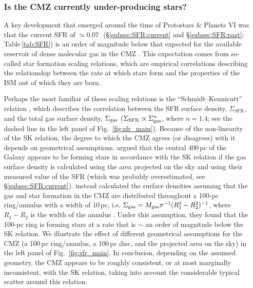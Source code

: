 \subsubsection{Is the CMZ currently under-producing stars?} 
\label{subsec:SFR:context}




A key development that emerged around the time of Protostars \& Planets VI was that the current SFR of \linebreak $\simeq0.07$\,\msunyr \ (\S\ref{subsec:SFR:current} and \S\ref{subsec:SFR:past}; Table\,\ref{tab:SFR}) is an order of magnitude below that expected for the available reservoir of dense molecular gas in the CMZ \citep{Longmore2013b}.
This expectation comes from so-called star formation scaling relations, which are empirical correlations describing the relationship between the rate at which stars form and the properties of the ISM out of which they are born.

Perhaps the most familiar of these scaling relations is the ``Schmidt–Kennicutt'' relation \citep[][hereafter SK relation]{Schmidt1959,Kennicutt1998}, which describes the correlation between the SFR surface density, $\Sigma_\mathrm{SFR}$, and the total gas surface density, $\Sigma_{\rm gas}$ ($\Sigma_\mathrm{SFR}\propto\Sigma_{\rm gas}^{n}$, where $n=1.4$; see the dashed line in the left panel of Fig.~\ref{fig:sfr_main}). Because of the non-linearity of the SK relation, the degree to which the CMZ agrees (or disagrees) with it depends on geometrical assumptions. \citet{Yusef-Zadeh2009} argued that the central 400\,pc of the Galaxy appears to be forming stars in accordance with the SK relation if the gas surface density is calculated using the area projected on the sky and using their measured value of the SFR (which was probably overestimated, see \S \ref{subsec:SFR:current}). \citet{Kruijssen2014a} instead calculated the surface densities assuming that the gas and star formation in the CMZ are distributed throughout a 100-pc ring/annulus with a width of 10\,pc, i.e. $\Sigma_{\rm gas}=M_\mathrm{gas}\pi^{-1}(R_1^2-R_2^2)^{-1}$, where $R_1-R_2$ is the width of the annulus \citep[see also][]{Longmore2013b}. Under this assumption, they found that the 100-pc ring is forming stars at a rate that is $\sim$ an order of magnitude below the SK relation. We illustrate the effect of different geometrical assumptions for the CMZ (a 100\,pc ring/annulus, a 100\,pc disc, and the projected area on the sky) in the left panel of Fig.~\ref{fig:sfr_main}. 
In conclusion, depending on the assumed geometry, the CMZ appears to be roughly consistent, or at most marginally inconsistent, with the SK relation, taking into account the considerable typical scatter around this relation.

